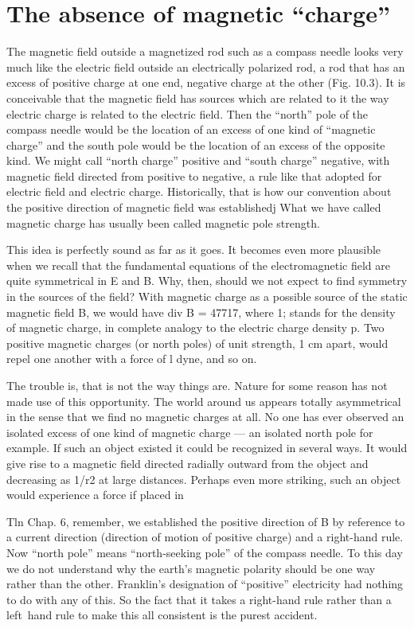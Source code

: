{%
\section{The absence of magnetic ``charge''}

The magnetic field outside a magnetized rod such as a compass
needle looks very much like the electric field outside an electrically
polarized rod, a rod that has an excess of positive charge at one end,
negative charge at the other (Fig. 10.3). It is conceivable that the
magnetic field has sources which are related to it the way electric
charge is related to the electric field. Then the ``north'' pole of the
compass needle would be the location of an excess of one kind of
``magnetic charge'' and the south pole would be the location of an
excess of the opposite kind. We might call ``north charge'' positive
and ``south charge'' negative, with magnetic field directed from positive
to negative, a rule like that adopted for electric field and electric
charge. Historically, that is how our convention about the positive
direction of magnetic field was establishedj What we have called
magnetic charge has usually been called magnetic pole strength.

This idea is perfectly sound as far as it goes. It becomes even more
plausible when we recall that the fundamental equations of the electromagnetic
field are quite symmetrical in E and B. Why, then,
should we not expect to find symmetry in the sources of the field?
With magnetic charge as a possible source of the static magnetic
field B, we would have div B = 47717, where 1; stands for the density
of magnetic charge, in complete analogy to the electric charge
density p. Two positive magnetic charges (or north poles) of unit
strength, 1 cm apart, would repel one another with a force of l dyne,
and so on.

The trouble is, that is not the way things are. Nature for some
reason has not made use of this opportunity. The world around us
appears totally asymmetrical in the sense that we find no magnetic
charges at all. No one has ever observed an isolated excess of one
kind of magnetic charge --- an isolated north pole for example. If
such an object existed it could be recognized in several ways. It
would give rise to a magnetic field directed radially outward from
the object and decreasing as 1/r2 at large distances. Perhaps even
more striking, such an object would experience a force if placed in

Tln Chap. 6, remember, we established the positive direction of B by reference to a
current direction (direction of motion of positive charge) and a right-hand rule. Now
``north pole'' means ``north-seeking pole'' of the compass needle. To this day we do
not understand why the earth's magnetic polarity should be one way rather than the
other. Franklin's designation of ``positive'' electricity had nothing to do with any of
this. So the fact that it takes a right-hand rule rather than a left~hand rule to make
this all consistent is the purest accident.

}
